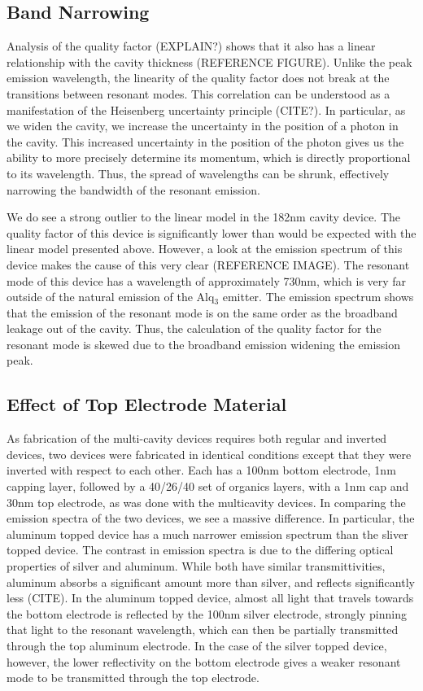 \documentclass{report}
\begin{document}
        \subsection{Band Narrowing}
            Analysis of the quality factor (EXPLAIN?) shows that it also has a linear relationship with the cavity thickness (REFERENCE FIGURE). Unlike the peak emission wavelength, the linearity of the quality factor does not break at the transitions between resonant modes. This correlation can be understood as a manifestation of the Heisenberg uncertainty principle (CITE?). In particular, as we widen the cavity, we increase the uncertainty in the position of a photon in the cavity. This increased uncertainty in the position of the photon gives us the ability to more precisely determine its momentum, which is directly proportional to its wavelength. Thus, the spread of wavelengths can be shrunk, effectively narrowing the bandwidth of the resonant emission.

            We do see a strong outlier to the linear model in the 182nm cavity device. The quality factor of this device is significantly lower than would be expected with the linear model presented above. However, a look at the emission spectrum of this device makes the cause of this very clear (REFERENCE IMAGE). The resonant mode of this device has a wavelength of approximately 730nm, which is very far outside of the natural emission of the Alq$_3$ emitter. The emission spectrum shows that the emission of the resonant mode is on the same order as the broadband leakage out of the cavity. Thus, the calculation of the quality factor for the resonant mode is skewed due to the broadband emission widening the emission peak.
        
        \subsection{Effect of Top Electrode Material}
            As fabrication of the multi-cavity devices requires both regular and inverted devices, two devices were fabricated in identical conditions except that they were inverted with respect to each other. Each has a 100nm bottom electrode, 1nm capping layer, followed by a 40/26/40 set of organics layers, with a 1nm cap and 30nm top electrode, as was done with the multicavity devices. In comparing the emission spectra of the two devices, we see a massive difference. In particular, the aluminum topped device has a much narrower emission spectrum than the sliver topped device. The contrast in emission spectra is due to the differing optical properties of silver and aluminum. While both have similar transmittivities, aluminum absorbs a significant amount more than silver, and reflects significantly less (CITE). In the aluminum topped device, almost all light that travels towards the bottom electrode is reflected by the 100nm silver electrode, strongly pinning that light to the resonant wavelength, which can then be partially transmitted through the top aluminum electrode. In the case of the silver topped device, however, the lower reflectivity on the bottom electrode gives a weaker resonant mode to be transmitted through the top electrode.
\end{document}

